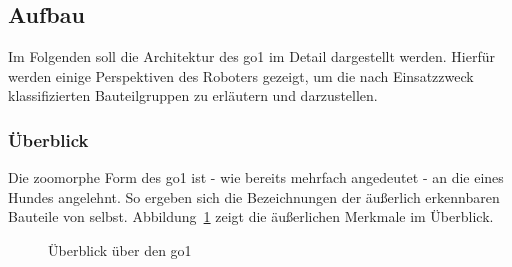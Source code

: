 \subsection{Aufbau}
\label{subsec:aufbau}

Im Folgenden soll die Architektur des \gls{go1} im Detail dargestellt werden.
Hierfür werden einige Perspektiven des Roboters gezeigt, um die nach Einsatzzweck klassifizierten Bauteilgruppen zu erläutern und darzustellen.

\subsubsection{Überblick}

Die zoomorphe Form des \gls{go1} ist - wie bereits mehrfach angedeutet - an die eines Hundes angelehnt.
So ergeben sich die Bezeichnungen der äußerlich erkennbaren Bauteile von selbst.
Abbildung~\ref{fig:allgemeine_architektur} zeigt die äußerlichen Merkmale im Überblick.

\begin{figure}[h]
    \caption[Überblick über den Go1]{Überblick über den \gls{go1}}\label{fig:allgemeine_architektur}
\end{figure}

